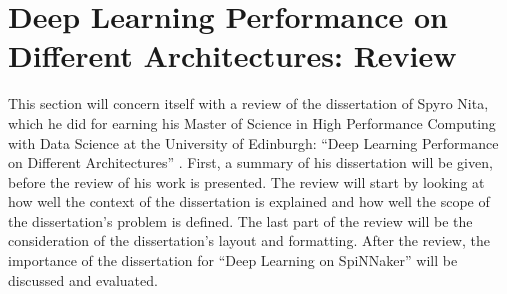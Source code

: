 \documentclass{article}
\begin{document}


\section{Deep Learning Performance on Different %
  Architectures: Review}
\label{sec:review}

This section will concern itself with a review of the
dissertation of Spyro Nita, which he did for earning his
Master of Science in High Performance Computing with Data
Science at the University of Edinburgh:
``Deep Learning Performance on Different Architectures''
 \citep{nita_2018}.
First, a summary of his dissertation will be given, before
the review of his work is presented.
The review will start by looking at how well the context
of the dissertation is explained and how well the scope
of the dissertation's problem is defined.
The last part of the review will be the consideration of
the dissertation's layout and formatting.
After the review, the importance of the dissertation for
``Deep Learning on SpiNNaker'' will be discussed and
evaluated.



\end{document}
